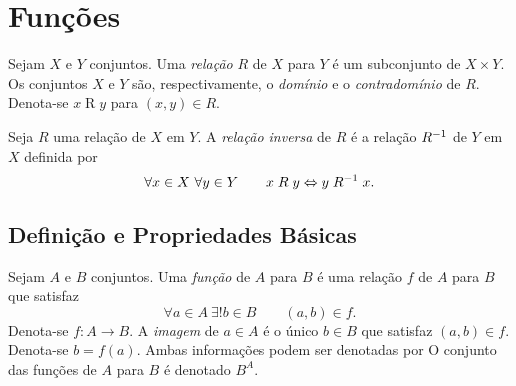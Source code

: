 

\chapter{Funções}

\begin{defi}
Sejam $X$ e $Y$ conjuntos. Uma \emph{relação} $R$ de $X$ para $Y$ é um subconjunto de $X \times Y$. Os conjuntos $X$ e $Y$ são, respectivamente, o \emph{domínio} e o \emph{contradomínio} de $R$. Denota-se $x \mathrel{R} y$ para $(x,y) \in R$.
\end{defi}

\begin{defi}
Seja $R$ uma relação de $X$ em $Y$. A \emph{relação inversa} de $R$ é a relação $R^{-1}$ de $Y$ em $X$ definida por
	\begin{equation*}
	\forall x \in X\ \forall y \in Y \qquad x \mathrel{R} y \Leftrightarrow y \mathrel{R^{-1}} x.
	\end{equation*}
\end{defi}


\section{Definição e Propriedades Básicas}

\begin{defi}
Sejam $A$ e $B$ conjuntos. Uma \emph{função} de $A$ para $B$ é uma relação $f$ de $A$ para $B$ que satisfaz
	\begin{equation*}
	\forall a \in A \ \exists! b \in B \qquad (a,b) \in f.
	\end{equation*}
Denota-se $f: A \to B$. A \emph{imagem} de $a \in A$ é o único $b \in B$ que satisfaz $(a,b) \in f$. Denota-se $b=f(a)$. Ambas informações podem ser denotadas por  O conjunto das funções de $A$ para $B$ é denotado $B^A$.
\end{defi}

